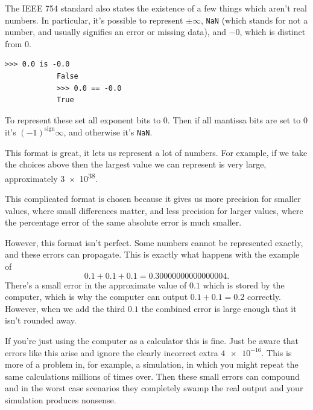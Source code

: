 \documentclass[fleqn]{LectureClass/LectureClass}
\begin{document}
    \begin{remark}{}{}
        The IEEE 754 standard also states the existence of a few things which aren't real numbers.
        In particular, it's possible to represent \(\pm\infty\), \lstinline|NaN| (which stands for not a number, and usually signifies an error or missing data), and \(-0\), which is distinct from \(0\).
        
        \begin{lstlisting}[gobble=12, basicstyle=\color{black!85}\ttfamily]
            >>> 0.0 is -0.0
            False
            >>> 0.0 == -0.0
            True
        \end{lstlisting}
        
        To represent these set all exponent bits to \(0\).
        Then if all mantissa bits are set to \(0\) it's \((-1)^{\text{sign}}\infty\), and otherwise it's \lstinline|NaN|.
    \end{remark}
    
    This format is great, it lets us represent a lot of numbers.
    For example, if we take the choices above then the largest value we can represent is very large, approximately \num{3e38}.
    
    This complicated format is chosen because it gives us more precision for smaller values, where small differences matter, and less precision for larger values, where the percentage error of the same absolute error is much smaller.
    
    However, this format isn't perfect.
    Some numbers cannot be represented exactly, and these errors can propagate.
    This is exactly what happens with the example of
    \begin{equation}
        0.1 + 0.1 + 0.1 = 0.30000000000000004.
    \end{equation}
    There's a small error in the approximate value of \(0.1\) which is stored by the computer, which is why the computer can output \(0.1 + 0.1 = 0.2\) correctly.
    However, when we add the third \(0.1\) the combined error is large enough that it isn't rounded away.
    
    If you're just using the computer as a calculator this is fine.
    Just be aware that errors like this arise and ignore the clearly incorrect extra \(\num{4e-16}\).
    This is more of a problem in, for example, a simulation, in which you might repeat the same calculations millions of times over.
    Then these small errors can compound and in the worst case scenarios they completely swamp the real output and your simulation produces nonsense.
    
\end{document}
